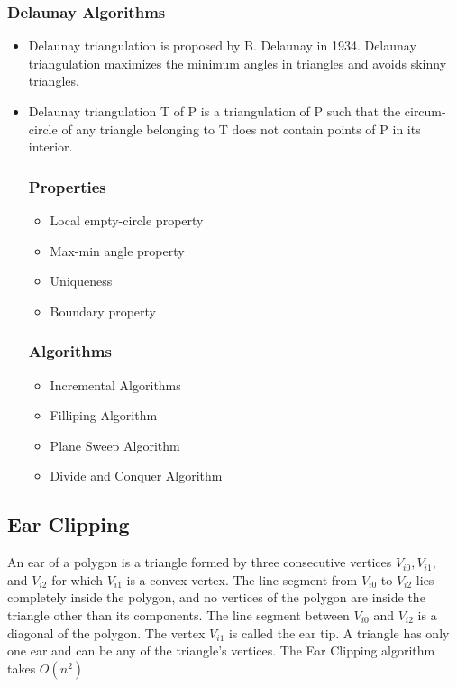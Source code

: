 \documentclass[conference]{IEEEtran}
\begin{document}
    \subsubsection{\textbf{Delaunay Algorithms}}
    \begin{itemize}
        \item Delaunay triangulation is proposed by B. Delaunay in 1934. Delaunay triangulation maximizes the minimum angles in triangles and avoids skinny triangles.
        \item Delaunay triangulation T of P is a triangulation of P such that the circum-circle of any triangle belonging to T does not contain points of P in its interior.
        \subsubsection{Properties}
        \begin{itemize}
            \item Local empty-circle property
            \item Max-min angle property
            \item Uniqueness
            \item Boundary property
        \end{itemize}
        \subsubsection{Algorithms}
        \begin{itemize}
            \item Incremental Algorithms
            \item Filliping Algorithm
            \item Plane Sweep Algorithm
            \item Divide and Conquer Algorithm
        \end{itemize}
    \end{itemize}
\subsection{Ear Clipping}
An ear of a polygon is a triangle formed by three consecutive vertices $V_{i0},V_{i1},$ and $V_{i2}$ for which $V_{i1}$ is a convex vertex. The line segment from $V_{i0}$ to $V_{i2}$ lies completely inside the polygon, and no vertices of the polygon are inside the triangle other than its components. The line segment between $V_{i0}$ and $V_{i2}$ is a diagonal of the polygon. The vertex $V_{i1}$ is called the ear tip. A triangle has only one ear and can be any of the triangle's vertices. The Ear Clipping algorithm takes $O(n^2)$\cite{EarClipping}
\end{document}
